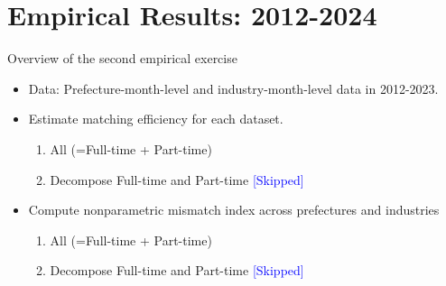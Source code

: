 \documentclass[aspectratio=169]{beamer}
\begin{document}
\section{Empirical Results: 2012-2024}

\begin{frame}{Overview of the second empirical exercise}
    \begin{itemize}
        \item Data: Prefecture-month-level and industry-month-level data in 2012-2023.
        \item Estimate matching efficiency for each dataset.
        \begin{enumerate}
            \item All (=Full-time + Part-time)
            \item Decompose Full-time and Part-time \textcolor{blue}{[Skipped]}
        \end{enumerate}
        \item Compute nonparametric mismatch index across prefectures and industries
        \begin{enumerate}
            \item All (=Full-time + Part-time)
            \item Decompose Full-time and Part-time \textcolor{blue}{[Skipped]}
        \end{enumerate}
    \end{itemize}
\end{frame}
\end{document}

